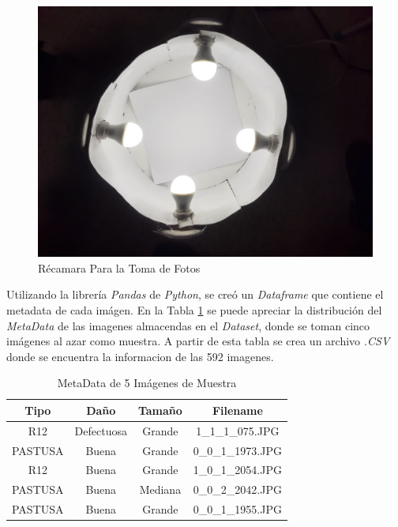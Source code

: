 	\begin{figure}[ht]
		\centering
		\includegraphics[scale=0.15]{Figs/Chamber.JPEG}
		\caption{Récamara Para la Toma de Fotos}
		\label{fig:chamber}
	\end{figure}
	
	Utilizando la librería \textit{Pandas} de \textit{Python}, se creó un \textit{Dataframe} que contiene el metadata de cada imágen. En la Tabla \ref{table:metadata} se puede apreciar la distribución del \textit{MetaData} de las imagenes almacendas en el \textit{Dataset}, donde se toman cinco imágenes al azar como muestra. A partir de esta tabla se crea un archivo \textit{.CSV} donde se encuentra la informacion de las 592 imagenes.
	
	\begin{table}[ht]
		\centering
		\begin{tabular}{|c|c|c|c|}
			\hline
			Tipo & Daño & Tamaño & Filename \\
			\hline
			R12 & Defectuosa & Grande & 1\_1\_1\_075.JPG \\
			\hline
			PASTUSA & Buena & Grande & 0\_0\_1\_1973.JPG \\
			\hline
			R12 & Buena & Grande & 1\_0\_1\_2054.JPG \\
			\hline
			PASTUSA & Buena & Mediana & 0\_0\_2\_2042.JPG \\
			\hline
			PASTUSA & Buena & Grande & 0\_0\_1\_1955.JPG \\
			\hline
		\end{tabular}	
		\caption{MetaData de 5 Imágenes de Muestra}
		\label{table:metadata}
	\end{table}


